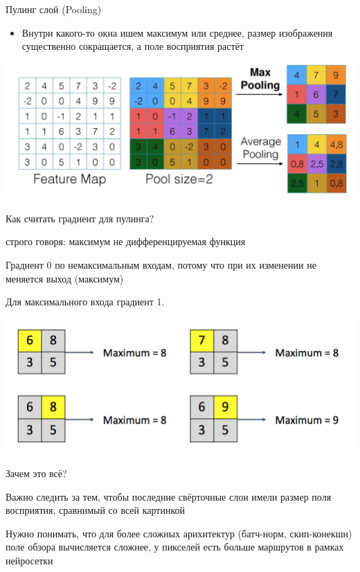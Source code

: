 \documentclass[notes,12pt, aspectratio=169]{beamer}
\newenvironment{wideitemize}{\itemize\addtolength{\itemsep}{10pt}}{\enditemize}
\begin{document}
\begin{frame}{Пулинг слой (Pooling)}
	\begin{itemize}
		\item  Внутри какого-то окна ишем максимум или среднее, размер изображения существенно сокращается, а поле восприятия растёт
	\end{itemize}
	
	\begin{center}
		\includegraphics[width=.7\linewidth]{pooling.png}
	\end{center}
\end{frame}


\begin{frame}{Как считать градиент для пулинга?}
	\begin{wideitemize}
		\item строго говоря: максимум не дифференцируемая функция
		\item Градиент 0 по немаксимальным входам, потому что при их изменении не меняется выход (максимум)
		\item Для максимального входа градиент 1.		
	\end{wideitemize}			
	\begin{center}
		\includegraphics[width=.7\linewidth]{pooling_grad.png}
	\end{center}
\end{frame}



\begin{frame}{Зачем это всё?}
	\begin{wideitemize}
	\item  Важно следить за тем, чтобы последние свёрточные слои имели размер поля восприятия, сравнимый со всей картинкой
	
	\item Нужно понимать, что для более сложных арихитектур (батч-норм, скип-конекшн) поле обзора вычисляется сложнее, у пикселей есть больше маршрутов в рамках нейросетки
	\end{wideitemize}
\end{frame}
\end{document}
